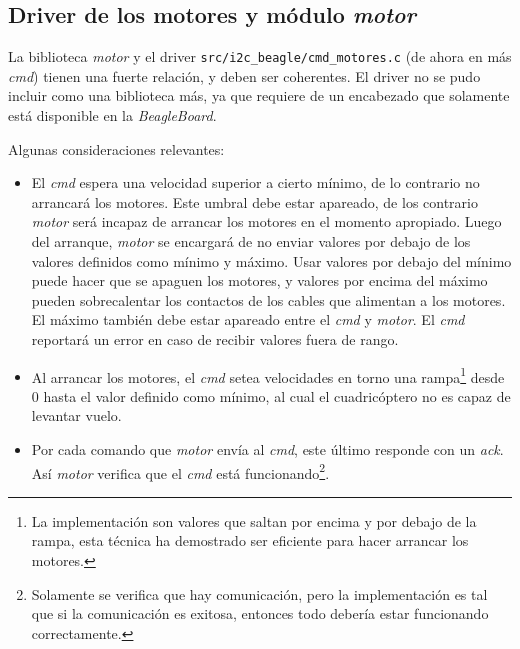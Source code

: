 \documentclass[main]{subfiles}
\begin{document}
\subsection{Driver de los motores y m\'odulo \textit{motor}}
\label{sec:software:cmd-motor}

La biblioteca \textit{motor} y el driver \verb+src/i2c_beagle/cmd_motores.c+ (de ahora en m\'as \textit{cmd}) tienen una fuerte relaci\'on, y deben ser coherentes. El driver no se pudo incluir como una biblioteca m\'as, ya que requiere de un encabezado que solamente est\'a disponible en la \textit{BeagleBoard}.

Algunas consideraciones relevantes:
\begin{itemize}
\item El \textit{cmd} espera una velocidad superior a cierto m\'inimo, de lo contrario no arrancar\'a los motores. Este umbral debe estar apareado, de los contrario \textit{motor} ser\'a incapaz de arrancar los motores en el momento apropiado.\newline
Luego del arranque, \textit{motor} se encargar\'a de no enviar valores por debajo de los valores definidos como m\'inimo y m\'aximo. Usar valores por debajo del m\'inimo puede hacer que se apaguen los motores, y valores por encima del m\'aximo pueden sobrecalentar los contactos de los cables que alimentan a los motores. El m\'aximo tambi\'en debe estar apareado entre el \textit{cmd} y \textit{motor}.\newline
El \textit{cmd} reportar\'a un error en caso de recibir valores fuera de rango.

\item Al arrancar los motores, el \textit{cmd} setea velocidades en torno una rampa\footnote{La implementaci\'on son valores que saltan por encima y por debajo de la rampa, esta t\'ecnica ha demostrado ser eficiente para hacer arrancar los motores.} desde 0 hasta el valor definido como m\'inimo, al cual el cuadric\'optero no es capaz de levantar vuelo.

\item Por cada comando que \textit{motor} env\'ia al \textit{cmd}, este \'ultimo responde con un \textit{ack}. Así \textit{motor} verifica que el \textit{cmd} est\'a funcionando\footnote{Solamente se verifica que hay comunicaci\'on, pero la implementaci\'on es tal que si la comunicaci\'on es exitosa, entonces todo deber\'ia estar funcionando correctamente.}.

\end{itemize}
\end{document}
